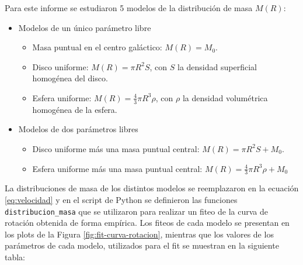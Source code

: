 \documentclass[letterpaper,oneside]{article}
\begin{document}
Para este informe se estudiaron 5 modelos de la distribución de masa $M(R)$:
\begin{itemize}
\item Modelos de un único parámetro libre
\begin{itemize}
\item Masa puntual en el centro galáctico: $M(R)=M_0$.
\item Disco uniforme: $M(R)=\pi R^2S$, con $S$ la densidad superficial homogénea del disco.
\item Esfera uniforme: $M(R)=\frac{4}{3}\pi R^3 \rho$, con $\rho$ la densidad volumétrica homogénea de la esfera.
\end{itemize}
\item Modelos de dos parámetros libres
\begin{itemize}
\item Disco uniforme más una masa puntual central: $M(R)=\pi R^2S+M_0$.
\item Esfera uniforme más una masa puntual central: $M(R)=\frac{4}{3}\pi R^3 \rho+M_0$
\end{itemize}
\end{itemize}

La distribuciones de masa de los distintos modelos se reemplazaron en la ecuación \ref{eq:velocidad} y en el script de Python se definieron las funciones \texttt{distribucion\_masa} que se utilizaron para realizar un fiteo de la curva de rotación obtenida de forma empírica. Los fiteos de cada modelo se presentan en los plots de la Figura \ref{fig:fit-curva-rotacion}, mientras que los valores de los parámetros de cada modelo, utilizados para el fit se muestran en la siguiente tabla:
\end{document}
